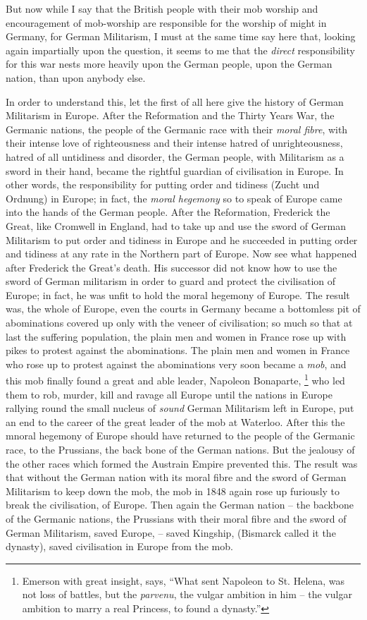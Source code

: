 But now while I say that the British people with their mob worship and encouragement of mob-worship are responsible for the worship of might in Germany,
for German Militarism, I must at the same time say here that,
looking again impartially upon the question, it seems to me that the \emph{direct}
responsibility for this war nests more heavily upon the German people,
upon the German nation, than upon anybody else.

In order to understand this, let the first of all here give the history of German Militarism in Europe.
After the Reformation and the Thirty Years War,
the Germanic nations, the people of the Germanic race with their \emph{moral fibre},
with their intense love of righteousness and their intense hatred of unrighteousness,
hatred of all untidiness and disorder, the German people, with Militarism as a sword in their hand,
became the rightful guardian of civilisation in Europe.
In other words, the responsibility for putting order and tidiness (Zucht und Ordnung) in Europe;
in fact, the \emph{moral hegemony} so to speak of Europe came into the hands of the German people.
After the Reformation, Frederick the Great, like Cromwell in England, had to take up and use the sword of German Militarism to put order and tidiness in Europe and he succeeded in putting order and tidiness at any rate in the Northern part of Europe.
Now see what happened after Frederick the Great's death.
His successor did not know how to use the sword of German militarism in order to guard and protect the civilisation of Europe;
in fact, he was unfit to hold the moral hegemony of Europe.
The result was, the whole of Europe, even the courts in Germany became a bottomless pit of abominations covered up only with the veneer of civilisation;
so much so that at last the suffering population, the plain men and women in France rose up with pikes to protest against the abominations.
The plain men and women in France who rose up to protest against the abominations very soon became a \emph{mob}, and this mob finally found a great and able leader,
Napoleon Bonaparte, \footnote{Emerson with great insight, says, ``What sent Napoleon to St. Helena, was not loss of battles, but the \emph{parvenu}, the vulgar ambition in him -- the vulgar ambition to marry a real Princess, to found a dynasty.''}
who led them to rob, murder, kill and ravage all Europe until the nations in Europe rallying round the small nucleus of \emph{sound} German Militarism left in Europe,
put an end to the career of the great leader of the mob at Waterloo.
After this the mnoral hegemony of Europe should have returned to the people of the Germanic race, to the Prussians, the back bone of the German nations.
But the jealousy of the other races which formed the Austrain Empire prevented this.
The result was that without the German nation with its moral fibre and the sword of German Militarism to keep down the mob, the mob in 1848 again rose up furiously to break the civilisation, of Europe.
Then again the German nation -- the backbone of the Germanic nations,
the Prussians with their moral fibre and the sword of German Militarism, saved Europe, -- saved Kingship, (Bismarck called it the dynasty), saved civilisation in Europe from the mob.

